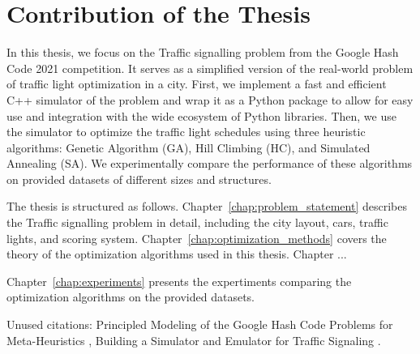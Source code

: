 \section*{Contribution of the Thesis}

In this thesis, we focus on the Traffic signalling problem from the Google Hash Code 2021 competition. It serves as a simplified version of the real-world problem of traffic light optimization in a city. First, we implement a fast and efficient C++ simulator of the problem and wrap it as a Python package to allow for easy use and integration with the wide ecosystem of Python libraries. Then, we use the simulator to optimize the traffic light schedules using three heuristic algorithms: Genetic Algorithm (GA), Hill Climbing (HC), and Simulated Annealing (SA). We experimentally compare the performance of these algorithms on provided datasets of different sizes and structures.

The thesis is structured as follows. Chapter~\ref{chap:problem_statement} describes the Traffic signalling problem in detail, including the city layout, cars, traffic lights, and scoring system. Chapter~\ref{chap:optimization_methods} covers the theory of the optimization algorithms used in this thesis. Chapter ...

Chapter~\ref{chap:experiments} presents the expertiments comparing the optimization algorithms on the provided datasets.

Unused citations: Principled Modeling of the Google Hash Code Problems for Meta-Heuristics \cite{rodrigues2023principled}, Building a Simulator and Emulator for Traffic Signaling \cite{li2022building}.
